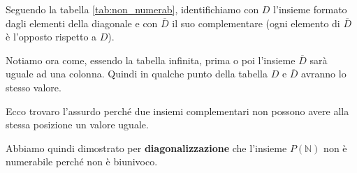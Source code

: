 \begin{exercise}
        Seguendo la tabella \ref{tab:non_numerab}, identifichiamo con $D$ l'insieme formato dagli elementi della diagonale e con $\overline{D}$ il suo complementare (ogni elemento di $\overline{D}$ è l'opposto rispetto a $D$).

        Notiamo ora come, essendo la tabella infinita, prima o poi l'insieme $\overline{D}$ sarà uguale ad una colonna.
        Quindi in qualche punto della tabella $D$ e $\overline{D}$ avranno lo stesso valore.

        Ecco trovaro l'assurdo perché due insiemi complementari non possono avere alla stessa posizione un valore uguale.

        Abbiamo quindi dimostrato per \textbf{diagonalizzazione} che l'insieme $P(\mathbb{N})$ non è numerabile perché non è biunivoco.
    \end{exercise}